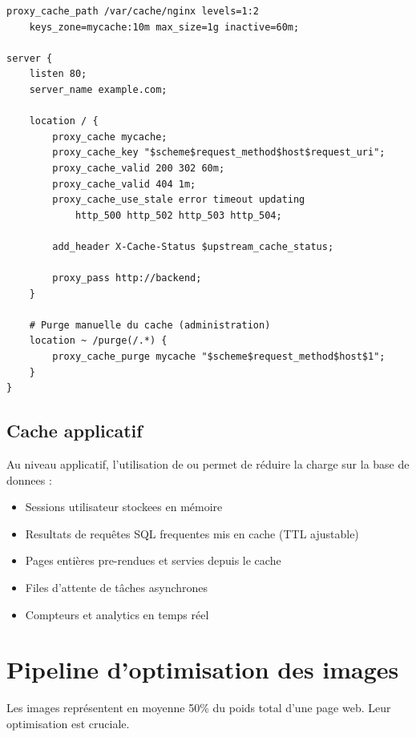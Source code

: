 \begin{lstlisting}[style=code,caption={Configuration NGINX pour le cache serveur FastCGI}]
proxy_cache_path /var/cache/nginx levels=1:2
    keys_zone=mycache:10m max_size=1g inactive=60m;

server {
    listen 80;
    server_name example.com;

    location / {
        proxy_cache mycache;
        proxy_cache_key "$scheme$request_method$host$request_uri";
        proxy_cache_valid 200 302 60m;
        proxy_cache_valid 404 1m;
        proxy_cache_use_stale error timeout updating
            http_500 http_502 http_503 http_504;

        add_header X-Cache-Status $upstream_cache_status;

        proxy_pass http://backend;
    }

    # Purge manuelle du cache (administration)
    location ~ /purge(/.*) {
        proxy_cache_purge mycache "$scheme$request_method$host$1";
    }
}
\end{lstlisting}

\subsection{Cache applicatif}

Au niveau applicatif, l'utilisation de  ou  permet de réduire la charge sur la base de donnees :

\begin{itemize}
    \item Sessions utilisateur stockees en mémoire
    \item Resultats de requêtes SQL frequentes mis en cache (TTL ajustable)
    \item Pages entières pre-rendues et servies depuis le cache
    \item Files d'attente de tâches asynchrones
    \item Compteurs et analytics en temps réel
\end{itemize}


\section{Pipeline d'optimisation des images}

Les images représentent en moyenne 50\% du poids total d'une page web. Leur optimisation est cruciale.

